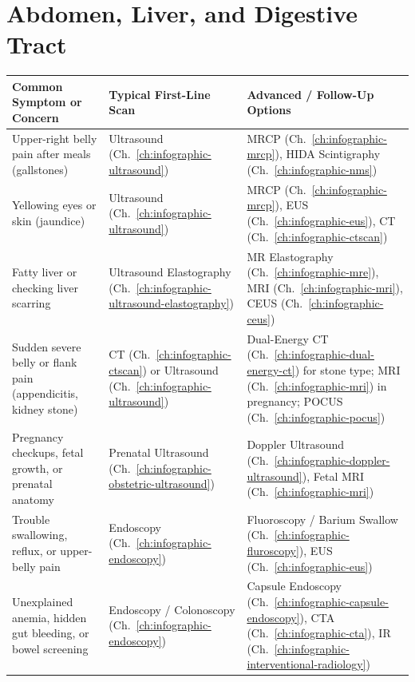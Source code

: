 \section{Abdomen, Liver, and Digestive Tract}
{\renewcommand{\arraystretch}{1.25}\noindent
\begin{tabularx}{\textwidth}{@{}p{} p{} X@{}}
\toprule
\textbf{Common Symptom or Concern} & \textbf{Typical First-Line Scan} & \textbf{Advanced / Follow-Up Options} \\
\midrule
Upper-right belly pain after meals (gallstones) & Ultrasound (Ch.~\ref{ch:infographic-ultrasound}) & MRCP (Ch.~\ref{ch:infographic-mrcp}), HIDA Scintigraphy (Ch.~\ref{ch:infographic-nms}) \\
Yellowing eyes or skin (jaundice) & Ultrasound (Ch.~\ref{ch:infographic-ultrasound}) & MRCP (Ch.~\ref{ch:infographic-mrcp}), EUS (Ch.~\ref{ch:infographic-eus}), CT (Ch.~\ref{ch:infographic-ctscan}) \\
Fatty liver or checking liver scarring & Ultrasound Elastography (Ch.~\ref{ch:infographic-ultrasound-elastography}) & MR Elastography (Ch.~\ref{ch:infographic-mre}), MRI (Ch.~\ref{ch:infographic-mri}), CEUS (Ch.~\ref{ch:infographic-ceus}) \\
Sudden severe belly or flank pain (appendicitis, kidney stone) & CT (Ch.~\ref{ch:infographic-ctscan}) or Ultrasound (Ch.~\ref{ch:infographic-ultrasound}) & Dual-Energy CT (Ch.~\ref{ch:infographic-dual-energy-ct}) for stone type; MRI (Ch.~\ref{ch:infographic-mri}) in pregnancy; POCUS (Ch.~\ref{ch:infographic-pocus}) \\
Pregnancy checkups, fetal growth, or prenatal anatomy & Prenatal Ultrasound (Ch.~\ref{ch:infographic-obstetric-ultrasound}) & Doppler Ultrasound (Ch.~\ref{ch:infographic-doppler-ultrasound}), Fetal MRI (Ch.~\ref{ch:infographic-mri}) \\
Trouble swallowing, reflux, or upper-belly pain & Endoscopy (Ch.~\ref{ch:infographic-endoscopy}) & Fluoroscopy / Barium Swallow (Ch.~\ref{ch:infographic-fluroscopy}), EUS (Ch.~\ref{ch:infographic-eus}) \\
Unexplained anemia, hidden gut bleeding, or bowel screening & Endoscopy / Colonoscopy (Ch.~\ref{ch:infographic-endoscopy}) & Capsule Endoscopy (Ch.~\ref{ch:infographic-capsule-endoscopy}), CTA (Ch.~\ref{ch:infographic-cta}), IR (Ch.~\ref{ch:infographic-interventional-radiology}) \\
\bottomrule
\end{tabularx}}

